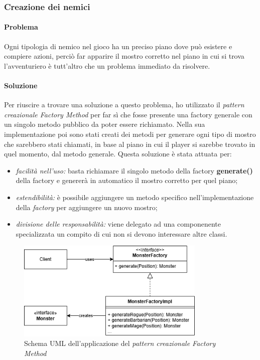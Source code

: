 \documentclass{report}
\begin{document}
\subsubsection{Creazione dei nemici}

\paragraph{Problema} Ogni tipologia di nemico nel gioco ha un preciso piano dove può esistere e compiere azioni, perciò far apparire il mostro corretto nel piano in cui si trova l'avventuriero è
%
tutt'altro che un problema immediato da risolvere.

\paragraph{Soluzione} Per riuscire a trovare una soluzione a questo problema, ho utilizzato il \textit{pattern creazionale Factory Method} per far sì che fosse presente una factory generale
%
con un singolo metodo pubblico da poter essere richiamato. Nella sua implementazione poi sono stati creati dei metodi per generare ogni tipo di mostro che sarebbero stati chiamati, in base
%
al piano in cui il player si sarebbe trovato in quel momento, dal metodo generale. Questa soluzione è stata attuata per:

\begin{itemize}
    \item \textit{facilità nell'uso:} basta richiamare il singolo metodo della factory \textbf{generate()} della factory e genererà in automatico il mostro corretto per quel piano;
    \item \textit{estendibilità:} è possibile aggiungere un metodo specifico nell'implementazione della \textit{factory} per aggiungere un nuovo mostro;
    \item \textit{divisione delle responsabilità:} viene delegato ad una componenente specializzata un compito di cui non si devono interessare altre classi.
\end{itemize}

\begin{figure}[H]
    \centering
    \includegraphics[width=9cm]{FactoryMethod.png}
    \caption{Schema UML dell'applicazione del \textit{pattern creazionale Factory Method}}
\end{figure}
\end{document}
